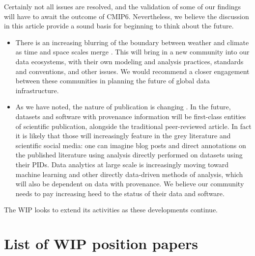 \documentclass[gmd,manuscript]{copernicus}
\newcommand{\pipref}[1] {\citep{ref:#1}}
\begin{document}
Certainly not all issues are resolved, and the validation of some of
our findings will have to await the outcome of CMIP6. Nevertheless, we
believe the discussion in this article provide a sound basis for
beginning to think about the future.

\begin{itemize}
\item There is an increasing blurring of the boundary between weather
  and climate as time and space scales merge \pipref{hoskins2013}.
  This will bring in a new community into our data ecosystems, with
  their own modeling and analysis practices, standards and
  conventions, and other issues. We would recommend a closer
  engagement between these communities in planning the future of
  global data infrastructure.
\item As we have noted, the nature of publication is changing
  \citep[see e.g][]{ref:davidetal2016}. In the future, datasets and
  software with provenance information will be first-class entities of
  scientific publication, alongside the traditional peer-reviewed
  article. In fact it is likely that those will increasingly feature
  in the grey literature and scientific social media: one can imagine
  blog posts and direct annotations on the published literature using
  analysis directly performed on datasets using their PIDs. Data
  analytics at large scale is increasingly moving toward machine
  learning and other directly data-driven methods of analysis, which
  will also be dependent on data with provenance. We believe our
  community needs to pay increasing heed to the status of their data
  and software.
\end{itemize}

The WIP looks to extend its activities as these developments continue.

\appendix

\section{List of WIP position papers}
\label{sec:wip}
\end{document}
